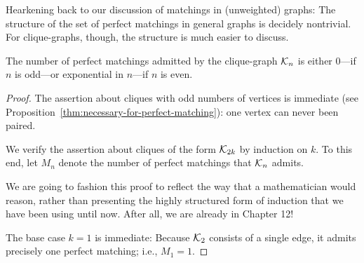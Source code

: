 \medskip

Hearkening back to our discussion of matchings in (unweighted) graphs: The structure of the set of perfect matchings in general graphs is decidely nontrivial.  For clique-graphs, though, the structure is much easier to discuss.

\begin{prop}
\label{thm:perfect-matchings-clique}
The number of perfect matchings admitted by the clique-graph $\mbox{$\cal K$}_n$ is either $0$---if $n$ is odd---or exponential in $n$---if $n$ is even.
\end{prop}

\begin{proof}
The assertion about cliques with odd numbers of vertices is immediate
(see Proposition~\ref{thm:necessary-for-perfect-matching}): one vertex can never been paired.

\smallskip

We verify the assertion about cliques of the form $\mbox{$\cal K$}_{2k}$ by induction on $k$.  To this end, let $M_n$ denote the number of perfect matchings that $\mbox{$\cal K$}_n$ admits.

\smallskip

We are going to fashion this proof to reflect the way that a mathematician would reason, rather than presenting the highly structured form of induction that we have been using until now.  After all, we are already in Chapter 12!

\medskip

\noindent 
The base case $k=1$ is immediate:  Because $\mbox{$\cal K$}_{2}$ consists of a single edge, it admits precisely one perfect matching; i.e., $M_1 = 1$.

\smallskip


\end{proof}
